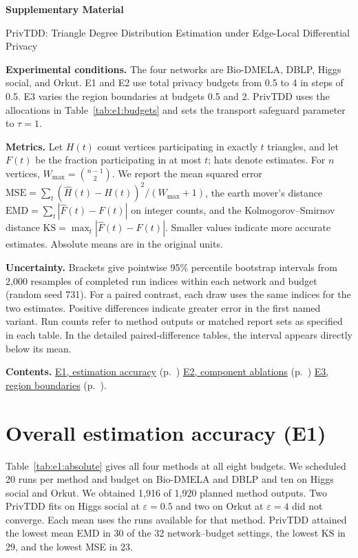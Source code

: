 \documentclass[10pt,letterpaper]{article}
\begin{document}
\thispagestyle{plain}
\begin{center}
{\LARGE\bfseries Supplementary Material\par}\vspace{4pt}
{\large PrivTDD: Triangle Degree Distribution Estimation under Edge-Local Differential Privacy\par}
\end{center}

\textbf{Experimental conditions.}
The four networks are Bio-DMELA, DBLP, Higgs social, and Orkut.
E1 and E2 use total privacy budgets from 0.5 to 4 in steps of 0.5.
E3 varies the region boundaries at budgets 0.5 and 2. PrivTDD uses the allocations in Table~\ref{tab:e1:budgets} and sets the transport safeguard parameter to $\tau=1$.

\textbf{Metrics.}
Let $H(t)$ count vertices participating in exactly $t$ triangles, and let $F(t)$ be
the fraction participating in at most $t$; hats denote estimates. For $n$ vertices,
$W_{\max}=\binom{n-1}{2}$. We report the mean squared error
$\mathrm{MSE}=\sum_t(\widehat H(t)-H(t))^2/(W_{\max}+1)$, the earth mover's
distance $\mathrm{EMD}=\sum_t|\widehat F(t)-F(t)|$ on integer counts, and the
Kolmogorov--Smirnov distance $\mathrm{KS}=\max_t|\widehat F(t)-F(t)|$.
Smaller values indicate more accurate estimates. Absolute means are in the original units.

\textbf{Uncertainty.}
Brackets give pointwise 95\% percentile bootstrap intervals from 2,000 resamples
of completed run indices within each network and budget (random seed 731).
For a paired contrast, each draw uses the same indices for the two estimates.
Positive differences indicate greater error in the first named variant.
Run counts refer to method outputs or matched report sets as specified in each table.
In the detailed paired-difference tables, the interval appears directly below its mean.

\textbf{Contents.}
\hyperref[sec:e1]{E1, estimation accuracy} (p.~\pageref{sec:e1}) \quad
\hyperref[sec:e2]{E2, component ablations} (p.~\pageref{sec:e2}) \quad
\hyperref[sec:e3]{E3, region boundaries} (p.~\pageref{sec:e3}).

\section{Overall estimation accuracy (E1)}\label{sec:e1}
Table~\ref{tab:e1:absolute} gives all four methods at all eight budgets. We scheduled
20 runs per method and budget on Bio-DMELA and DBLP and ten on Higgs social and Orkut.
We obtained 1,916 of 1,920 planned method outputs. Two PrivTDD fits on Higgs social at $\varepsilon=0.5$
and two on Orkut at $\varepsilon=4$ did not converge. Each mean uses the runs
available for that method. PrivTDD attained the lowest mean EMD in 30 of the 32
network--budget settings, the lowest KS in 29, and the lowest MSE in 23.
\end{document}
